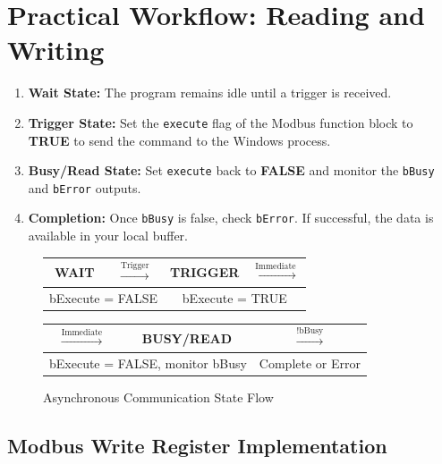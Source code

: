 \documentclass[11pt,a4paper]{article}
\begin{document}
\section{Practical Workflow: Reading and Writing}

\begin{enumerate}[leftmargin=*]
    \item \textbf{Wait State:} The program remains idle until a trigger is received.
    \item \textbf{Trigger State:} Set the \texttt{execute} flag of the Modbus function block to \textbf{TRUE} to send the command to the Windows process.
    \item \textbf{Busy/Read State:} Set \texttt{execute} back to \textbf{FALSE} and monitor the \texttt{bBusy} and \texttt{bError} outputs.
    \item \textbf{Completion:} Once \texttt{bBusy} is false, check \texttt{bError}. If successful, the data is available in your local buffer.
\end{enumerate}

\begin{figure}[h]
\centering
\begin{tabular}{|c|c|c|c|}
\hline
\textbf{WAIT} & $\xrightarrow{\text{Trigger}}$ & \textbf{TRIGGER} & $\xrightarrow{\text{Immediate}}$ \\
\hline
\multicolumn{2}{|c|}{bExecute = FALSE} & \multicolumn{2}{c|}{bExecute = TRUE} \\
\hline
\end{tabular}

\vspace{0.3cm}

\begin{tabular}{|c|c|c|}
\hline
$\xrightarrow{\text{Immediate}}$ & \textbf{BUSY/READ} & $\xrightarrow{\text{!bBusy}}$ \\
\hline
\multicolumn{2}{|c|}{bExecute = FALSE, monitor bBusy} & Complete or Error \\
\hline
\end{tabular}
\caption{Asynchronous Communication State Flow}
\end{figure}

\subsection{Modbus Write Register Implementation}
\end{document}
